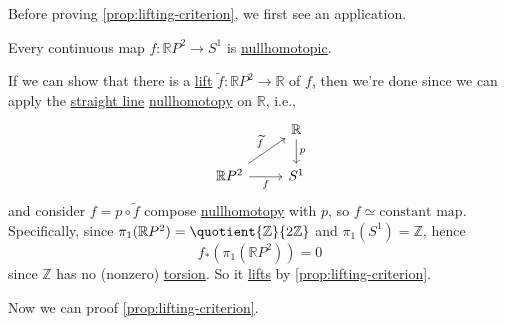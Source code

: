Before proving \autoref{prop:lifting-criterion}, we first see an application.

\begin{eg}
	Every continuous map \(f\colon \mathbb{R} P^{2}\to S^1\) is \hyperref[def:nullhomotopic]{nullhomotopic}.
\end{eg}
\begin{explanation}
	If we can show that there is a \hyperref[def:lift]{lift} \(\widetilde{f} \colon \mathbb{R} P^{2}\to \mathbb{R}\) of \(f\), then we're done since we can apply the \hyperref[eg:lec1:straight-line-homotopy]{straight line} \hyperref[def:nullhomotopic]{nullhomotopy}
	on \(\mathbb{R} \), i.e.,
	\[
		\begin{tikzcd}
			& {\mathbb{R}} \\
			{\mathbb{R}P^2} & {S^1}
			\arrow["f"', from=2-1, to=2-2]
			\arrow["{\widetilde{f}}", from=2-1, to=1-2]
			\arrow["p", from=1-2, to=2-2]
		\end{tikzcd}
	\]
	and consider \(f = p \circ \widetilde{f} \) compose \hyperref[def:nullhomotopic]{nullhomotopy} with \(p\), so \(f\simeq \text{constant map} \). Specifically, since \(\pi _1(\mathbb{R} P^{2}) = \quotient{\mathbb{Z}}{2 \mathbb{Z}}\) and
	\(\pi _1(S^1) = \mathbb{Z} \), hence
	\[
		f_\ast (\pi _1(\mathbb{R} P^{2} )) = 0
	\]
	since \(\mathbb{Z} \) has no (nonzero) \hyperref[def:torsion-subgroup]{torsion}. So it \hyperref[prop:homotopy-lifting-property]{lifts} by \autoref{prop:lifting-criterion}.
\end{explanation}

Now we can proof \autoref{prop:lifting-criterion}.

